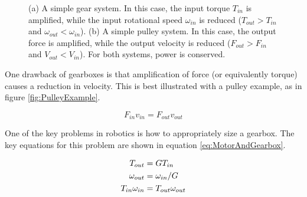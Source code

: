 \begin{figure}[h]		%
\begin{centering}
  \hspace{0.1\textwidth}%
\end{centering}
\caption[Diagram: Force Amplification with Gearbox and Pulley Systems]{(a) A simple gear system. In this case, the input torque $T_{in}$ is amplified, while the input rotational speed $\omega_{in}$ is reduced ($T_{out}>T_{in}$ and $\omega_{out}<\omega_{in}$). (b) A simple pulley system. In this case, the output force is amplified, while the output velocity is reduced ($F_{out}>F_{in}$ and $V_{out}<V_{in}$). For both systems, power is conserved.}
\label{fig:GearboxAndPulleyExample}
\end{figure}
%

One drawback of gearboxes is that amplification of force (or equivalently torque) causes a reduction in velocity. This is best illustrated with a pulley example, as in figure \ref{fig:PulleyExample}.

\begin{equation}
F_{in}v_{in} = F_{out}v_{out}
\label{eq:PulleyExample}
\end{equation}

One of the key problems in robotics is how to appropriately size a gearbox. The key equations for this problem are shown in equation \ref{eq:MotorAndGearbox}.

\begin{align}
T_{out} &=GT_{in} \notag \\
\omega_{out} &=\omega_{in}/G \notag \\
T_{in}\omega_{in}&=T_{out}\omega_{out}
\label{eq:MotorAndGearbox}
\end{align}

